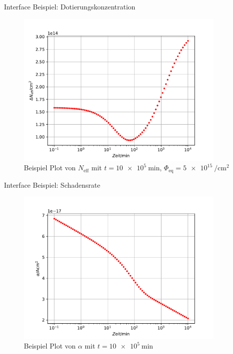 \documentclass[aspectratio=1610, 9pt]{beamer}
\begin{document}
\begin{frame}{Interface Beispiel: Dotierungskonzentration}
  \begin{figure}
    \includegraphics[width=0.9\textwidth]{images/interface_n_eff.PDF}
    \caption{Beispiel Plot von $N_{\mathrm{eff}}$ mit $t = \SI{10e5}{\minute}$, $\Phi_{\mathrm{eq}}= \SI{5e15}{\per\centi\meter\squared}$}
  \end{figure}
\end{frame}

\begin{frame}{Interface Beispiel: Schadensrate}
  \begin{figure}
    \includegraphics[width=0.9\textwidth]{images/interface_damage.PDF}
    \caption{Beispiel Plot von $\alpha$ mit $t = \SI{10e5}{\minute}$}
  \end{figure}
\end{frame}
\end{document}

